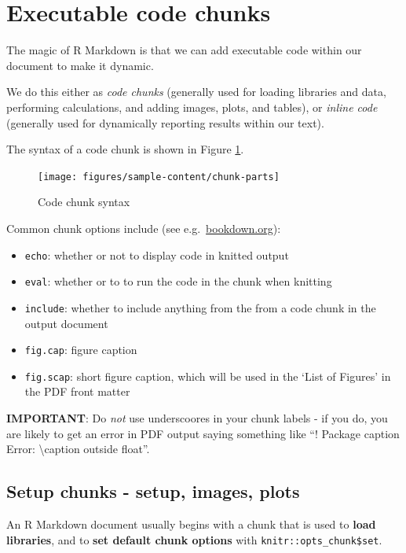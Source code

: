 \documentclass[a4paper, nobind]{templates/ociamthesis}
\providecommand{\tightlist}{%
  \setlength{\itemsep}{0pt}\setlength{\parskip}{0pt}}
\begin{document}
\hypertarget{code}{%
\section{Executable code chunks}\label{code}}

The magic of R Markdown is that we can add executable code within our document to make it dynamic.

We do this either as \emph{code chunks} (generally used for loading libraries and data, performing calculations, and adding images, plots, and tables), or \emph{inline code} (generally used for dynamically reporting results within our text).

The syntax of a code chunk is shown in Figure \ref{fig:chunk-parts}.

\begin{figure}[H]
\texttt{[image: figures/sample-content/chunk-parts]} \caption{Code chunk syntax}\label{fig:chunk-parts}
\end{figure}

Common chunk options include (see e.g.~\href{https://bookdown.org/yihui/rmarkdown/r-code.html}{bookdown.org}):

\begin{itemize}
\tightlist
\item
  \texttt{echo}: whether or not to display code in knitted output
\item
  \texttt{eval}: whether or to to run the code in the chunk when knitting
\item
  \texttt{include}: whether to include anything from the from a code chunk in the output document
\item
  \texttt{fig.cap}: figure caption
\item
  \texttt{fig.scap}: short figure caption, which will be used in the `List of Figures' in the PDF front matter
\end{itemize}

\textbf{IMPORTANT}: Do \emph{not} use underscoores in your chunk labels - if you do, you are likely to get an error in PDF output saying something like ``! Package caption Error: \textbackslash caption outside float''.

\hypertarget{setup-chunks---setup-images-plots}{%
\subsection{Setup chunks - setup, images, plots}\label{setup-chunks---setup-images-plots}}

An R Markdown document usually begins with a chunk that is used to \textbf{load libraries}, and to \textbf{set default chunk options} with \texttt{knitr::opts\_chunk\$set}.
\end{document}
